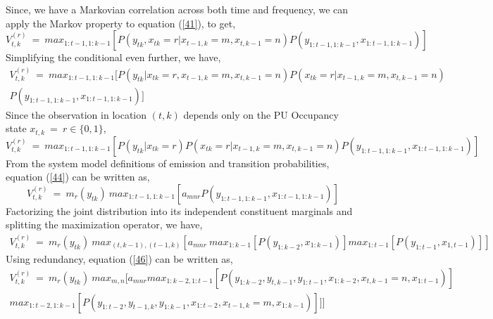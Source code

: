 \documentclass[12pt, draftcls, onecolumn]{IEEEtran}
\begin{document}
Since, we have a Markovian correlation across both time and frequency, we can apply the Markov property to equation (\ref{41}), to get,
\begin{equation}\label{42}
         V_{t,k}^{(r)}\ =\ max_{1:t-1,1:k-1}[P(y_{tk}, x_{tk}=r|x_{t-1,k}=m,x_{t,k-1}=n)P(y_{1:t-1,1:k-1}, x_{1:t-1,1:k-1})]
\end{equation}
Simplifying the conditional even further, we have,
\begin{equation}\label{43}
\begin{aligned}
    V_{t,k}^{(r)}\ =\ max_{1:t-1,1:k-1}[P(y_{tk}|x_{tk}=r,x_{t-1,k}=m,x_{t,k-1}=n)P(x_{tk}=r|x_{t-1,k}=m,x_{t,k-1}=n)\\P(y_{1:t-1,1:k-1}, x_{1:t-1,1:k-1})]
\end{aligned}
\end{equation}
Since the observation in location $(t,k)$ depends only on the PU Occupancy state $x_{t,k}\ =\ r \in \{0,1\}$,
\begin{equation}\label{44}
    V_{t,k}^{(r)}\ =\ max_{1:t-1,1:k-1}[P(y_{tk}|x_{tk}=r)P(x_{tk}=r|x_{t-1,k}=m,x_{t,k-1}=n)P(y_{1:t-1,1:k-1}, x_{1:t-1,1:k-1})]
\end{equation}
From the system model definitions of emission and transition probabilities, equation (\ref{44}) can be written as,
\begin{equation}\label{45}
    V_{t,k}^{(r)}\ =\ m_r(y_{tk})\ max_{1:t-1,1:k-1}[a_{mnr}P(y_{1:t-1,1:k-1}, x_{1:t-1,1:k-1})]
\end{equation}
Factorizing the joint distribution into its independent constituent marginals and splitting the maximization operator, we have,
\begin{equation}\label{46}
    \begin{aligned}
         V_{t,k}^{(r)}\ =\ m_r(y_{tk})\ max_{(t,k-1),(t-1,k)}[a_{mnr}\  max_{1:k-1}[P(y_{1:k-2},x_{1:k-1})]max_{1:t-1}[P(y_{1:t-1},x_{1,t-1})]]
    \end{aligned}
\end{equation}
Using redundancy, equation (\ref{46}) can be written as,
\begin{equation}\label{47}
    \begin{aligned}
         V_{t,k}^{(r)}\ =\ m_r(y_{tk})\ max_{m,n}[a_{mnr}max_{1:k-2,1:t-1}[P(y_{1:k-2},y_{t,k-1},y_{1:t-1},x_{1:k-2},x_{t,k-1}=n,x_{1:t-1})]\\max_{1:t-2,1:k-1}[P(y_{1:t-2},y_{t-1,k},y_{1:k-1},x_{1:t-2},x_{t-1,k}=m,x_{1:k-1})]]]
    \end{aligned}
\end{equation}
\end{document}
